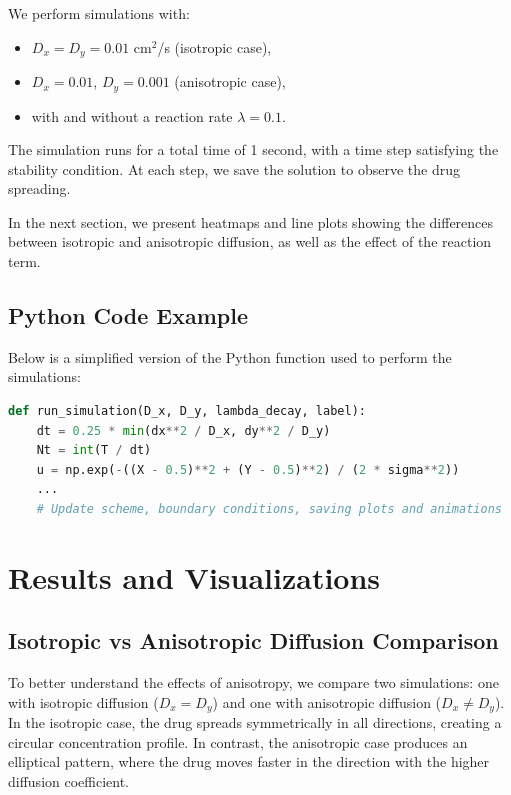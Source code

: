 \documentclass[11pt, a4paper]{article}
\begin{document}
We perform simulations with:
\begin{itemize}
    \item \( D_x = D_y = 0.01 \) cm\(^2\)/s (isotropic case),
    \item \( D_x = 0.01 \), \( D_y = 0.001 \) (anisotropic case),
    \item with and without a reaction rate \( \lambda = 0.1 \).
\end{itemize}

The simulation runs for a total time of 1 second, with a time step satisfying the stability condition. At each step, we save the solution to observe the drug spreading.

In the next section, we present heatmaps and line plots showing the differences between isotropic and anisotropic diffusion, as well as the effect of the reaction term.

\subsection{Python Code Example}

Below is a simplified version of the Python function used to perform the simulations:

\begin{lstlisting}[language=Python, caption=Core simulation loop in Python]
def run_simulation(D_x, D_y, lambda_decay, label):
    dt = 0.25 * min(dx**2 / D_x, dy**2 / D_y)
    Nt = int(T / dt)
    u = np.exp(-((X - 0.5)**2 + (Y - 0.5)**2) / (2 * sigma**2))
    ...
    # Update scheme, boundary conditions, saving plots and animations
\end{lstlisting}

\section{Results and Visualizations}

\subsection{Isotropic vs Anisotropic Diffusion Comparison}
To better understand the effects of anisotropy, we compare two simulations: one with isotropic diffusion (\( D_x = D_y \)) and one with anisotropic diffusion (\( D_x \neq D_y \)). In the isotropic case, the drug spreads symmetrically in all directions, creating a circular concentration profile. In contrast, the anisotropic case produces an elliptical pattern, where the drug moves faster in the direction with the higher diffusion coefficient.
\end{document}
